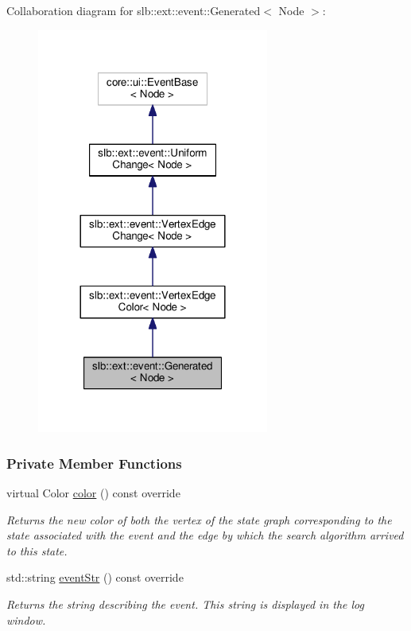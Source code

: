 Collaboration diagram for slb\+:\+:ext\+:\+:event\+:\+:Generated$<$ Node $>$\+:\nopagebreak
\begin{figure}[H]
\begin{center}
\leavevmode
\includegraphics[width=216pt]{structslb_1_1ext_1_1event_1_1Generated__coll__graph}
\end{center}
\end{figure}
\subsubsection*{Private Member Functions}
\begin{DoxyCompactItemize}
\item 
virtual Color \hyperlink{structslb_1_1ext_1_1event_1_1Generated_ae7d0033ee8badedc3057c363ecd00650}{color} () const override
\begin{DoxyCompactList}\small\item\em Returns the new color of both the vertex of the state graph corresponding to the state associated with the event and the edge by which the search algorithm arrived to this state. \end{DoxyCompactList}\item 
std\+::string \hyperlink{structslb_1_1ext_1_1event_1_1Generated_ad2bf6cf56f05c805b19dfa1ca73b5ae6}{event\+Str} () const override
\begin{DoxyCompactList}\small\item\em Returns the string describing the event. This string is displayed in the log window. \end{DoxyCompactList}\end{DoxyCompactItemize}
